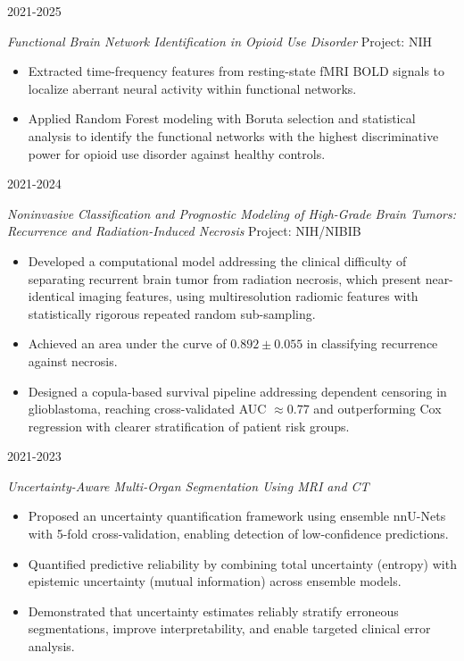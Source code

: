 \documentclass[11pt,letterpaper]{article}
\newcommand{\entry}[2]{%
  \needspace{3\baselineskip}%
  \noindent\begin{minipage}[t]{0.155\textwidth}\raggedright\small #1\end{minipage}%
  \hspace{0.015\textwidth}%
  \begin{minipage}[t]{0.825\textwidth}#2\end{minipage}\par\vspace{7pt}}
\begin{document}
\entry{2021-2025}{\textit{Functional Brain Network Identification in Opioid Use Disorder} \quad Project: NIH
\begin{itemize}
\item Extracted time-frequency features from resting-state fMRI BOLD signals to localize aberrant neural activity within functional networks.
\item Applied Random Forest modeling with Boruta selection and statistical analysis to identify the functional networks with the highest discriminative power for opioid use disorder against healthy controls.
\end{itemize}}

\entry{2021-2024}{\textit{Noninvasive Classification and Prognostic Modeling of High-Grade Brain Tumors: Recurrence and Radiation-Induced Necrosis} \quad Project: NIH/NIBIB
\begin{itemize}
\item Developed a computational model addressing the clinical difficulty of separating recurrent brain tumor from radiation necrosis, which present near-identical imaging features, using multiresolution radiomic features with statistically rigorous repeated random sub-sampling.
\item Achieved an area under the curve of $0.892 \pm 0.055$ in classifying recurrence against necrosis.
\item Designed a copula-based survival pipeline addressing dependent censoring in glioblastoma, reaching cross-validated AUC $\approx 0.77$ and outperforming Cox regression with clearer stratification of patient risk groups.
\end{itemize}}

\entry{2021-2023}{\textit{Uncertainty-Aware Multi-Organ Segmentation Using MRI and CT}
\begin{itemize}
\item Proposed an uncertainty quantification framework using ensemble nnU-Nets with 5-fold cross-validation, enabling detection of low-confidence predictions.
\item Quantified predictive reliability by combining total uncertainty (entropy) with epistemic uncertainty (mutual information) across ensemble models.
\item Demonstrated that uncertainty estimates reliably stratify erroneous segmentations, improve interpretability, and enable targeted clinical error analysis.
\end{itemize}}
\end{document}
